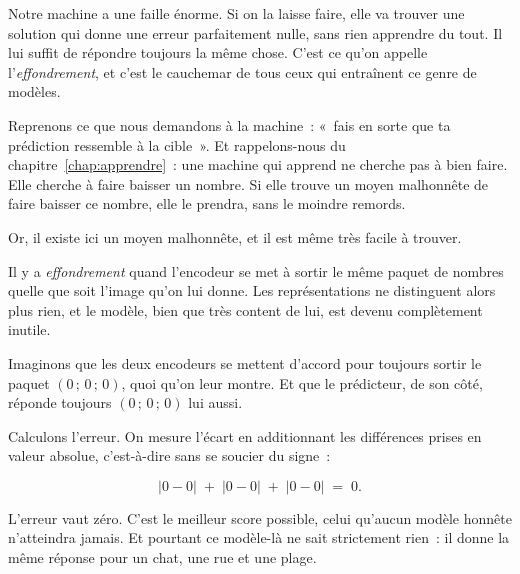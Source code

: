 \begin{enclair}
Notre machine a une faille énorme. Si on la laisse faire, elle va trouver
une solution qui donne une erreur parfaitement nulle, sans rien apprendre du
tout. Il lui suffit de répondre toujours la même chose. C'est ce qu'on
appelle l'\emph{effondrement}, et c'est le cauchemar de tous ceux qui
entraînent ce genre de modèles.
\end{enclair}

Reprenons ce que nous demandons à la machine~: «~fais en sorte que ta
prédiction ressemble à la cible~». Et rappelons-nous du
chapitre~\ref{chap:apprendre}~: une machine qui apprend ne cherche pas à
bien faire. Elle cherche à faire baisser un nombre. Si elle trouve un moyen
malhonnête de faire baisser ce nombre, elle le prendra, sans le moindre
remords.

Or, il existe ici un moyen malhonnête, et il est même très facile à trouver.

\begin{definition}
Il y a \emph{effondrement} quand l'encodeur se met à sortir le même paquet
de nombres quelle que soit l'image qu'on lui donne. Les représentations ne
distinguent alors plus rien, et le modèle, bien que très content de lui,
est devenu complètement inutile.
\end{definition}

\begin{exemple}
Imaginons que les deux encodeurs se mettent d'accord pour toujours sortir le
paquet $(0 \,;\, 0 \,;\, 0)$, quoi qu'on leur montre. Et que le prédicteur,
de son côté, réponde toujours $(0 \,;\, 0 \,;\, 0)$ lui aussi.

Calculons l'erreur. On mesure l'écart en additionnant les différences prises
en valeur absolue, c'est-à-dire sans se soucier du signe~:

\[
  |0 - 0| \;+\; |0 - 0| \;+\; |0 - 0| \;=\; 0 .
\]

L'erreur vaut zéro. C'est le meilleur score possible, celui qu'aucun modèle
honnête n'atteindra jamais. Et pourtant ce modèle-là ne sait strictement
rien~: il donne la même réponse pour un chat, une rue et une plage.
\end{exemple}

